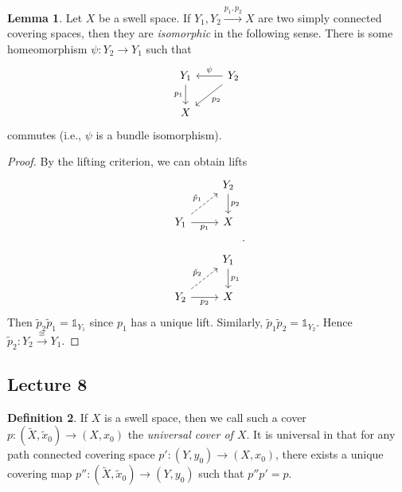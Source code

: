 \documentclass[10pt,letterpaper,cm]{nupset}
\theoremstyle{definition}
\newtheorem{definition}{Definition}[subsection]
\theoremstyle{theorem}
\newtheorem{lemma}[definition]{Lemma}
\theoremstyle{remark}
\newcommand{\1}{\mathbb{1}}
\newcommand{\0}{\vec 0}
\begin{document}
\begin{lemma}
Let $X$ be a swell space.  If $Y_1, Y_2 \overset{p_1, p_2}{\longrightarrow} X$ are two simply connected covering spaces, then they are \textit{isomorphic} in the following sense. There is some homeomorphism $\psi : Y_2 \to Y_1$ such that 
\[
\begin{tikzcd}
Y_1 \arrow[d, "p_1"'] & Y_2 \arrow[ld, "p_2"] \arrow[l, "\psi"'] \\
X & 
\end{tikzcd}
\] commutes (i.e., $\psi$ is a bundle isomorphism).
\end{lemma}
\begin{proof}
By the lifting criterion, we can obtain lifts
\[
\begin{tikzcd}
 & Y_2 \arrow[d, "p_2"] \\
Y_1 \arrow[r, "p_1"'] \arrow[ru, "\tilde{p}_1", dashed] & X \\
 & Y_1 \arrow[d, "p_1"] \\
Y_2 \arrow[r, "p_2"'] \arrow[ru, "\tilde{p}_2", dashed] & X
\end{tikzcd}.
\] Then $\tilde{p}_2\tilde{p}_1 = \1_{Y_1}$ since $p_1$ has a unique lift. Similarly, $\tilde{p}_1\tilde{p}_2 = \1_{Y_2}$. Hence $\tilde{p}_2 : Y_2 \overset{\cong}{\longrightarrow} Y_1.$ 
\end{proof}

\subsection{Lecture 8}

\begin{definition}
If $X$ is a swell space, then we call such a cover $p: (\widetilde{X}, \tilde{x}_0) \to (X, x_0)$ the \textit{universal cover of $X$}. It is universal in that for any path connected covering space $p': (Y, y_0) \to (X, x_0)$, there exists a unique covering map $p'': (\widetilde{X}, \tilde{x}_0) \to (Y, y_0)$ such that $p'' p' = p$. 
\end{definition}
\end{document}
